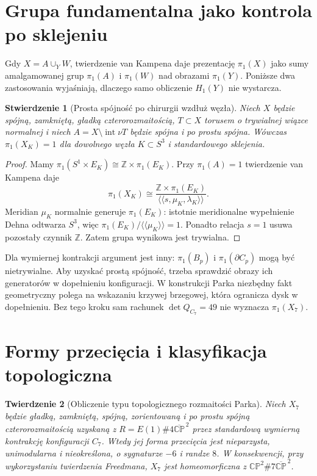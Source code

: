 \documentclass[11pt,a4paper]{report}
\numberwithin{equation}{section}
\theoremstyle{plain}
\newtheorem{twierdzenie}{Twierdzenie}[section]
\newtheorem{stwierdzenie}[twierdzenie]{Stwierdzenie}
\theoremstyle{definition}
\theoremstyle{remark}
\begin{document}
\section{Grupa fundamentalna jako kontrola po sklejeniu}
\label{sec:tg-syn-pi1}

Gdy $X=A\cup_Y W$, twierdzenie van Kampena daje prezentację
$\pi_1(X)$ jako sumy amalgamowanej grup $\pi_1(A)$ i
$\pi_1(W)$ nad obrazami $\pi_1(Y)$. Poniższe dwa zastosowania
wyjaśniają, dlaczego samo obliczenie $H_1(Y)$ nie wystarcza.

\begin{stwierdzenie}[Prosta spójność po chirurgii wzdłuż węzła]
\label{prop:tg-syn-pi1}
Niech $X$ będzie spójną, zamkniętą, gładką czterorozmaitością,
$T\subset X$ torusem o trywialnej wiązce normalnej i niech
$A=X\setminus\operatorname{int}\nu T$ będzie spójna i po prostu
spójna. Wówczas $\pi_1(X_K)=1$ dla dowolnego węzła
$K\subset S^3$ i standardowego sklejenia.
\end{stwierdzenie}

\begin{proof}
Mamy $\pi_1(S^1\times E_K)\cong\mathbb Z\times\pi_1(E_K)$.
Przy $\pi_1(A)=1$ twierdzenie van Kampena daje
\[
 \pi_1(X_K)\cong
 \frac{\mathbb Z\times\pi_1(E_K)}
 {\langle\!\langle s,\mu_K,\lambda_K\rangle\!\rangle}.
\]
Meridian $\mu_K$ normalnie generuje $\pi_1(E_K)$: istotnie
meridionalne wypełnienie Dehna odtwarza $S^3$, więc
$\pi_1(E_K)/\langle\!\langle\mu_K\rangle\!\rangle=1$.
Ponadto relacja $s=1$ usuwa pozostały czynnik $\mathbb Z$.
Zatem grupa wynikowa jest trywialna.
\end{proof}

Dla wymiernej kontrakcji argument jest inny:
$\pi_1(B_p)$ i $\pi_1(\partial C_p)$ mogą być nietrywialne.
Aby uzyskać prostą spójność, trzeba sprawdzić obrazy ich
generatorów w dopełnieniu konfiguracji. W konstrukcji Parka
niezbędny fakt geometryczny polega na wskazaniu krzywej
brzegowej, która ogranicza dysk w dopełnieniu. Bez tego
kroku sam rachunek $\det Q_{C_7}=49$ nie wyznacza
$\pi_1(X_7)$.

\section{Formy przecięcia i klasyfikacja topologiczna}
\label{sec:tg-syn-freedman}

\begin{twierdzenie}[Obliczenie typu topologicznego rozmaitości Parka]
\label{thm:tg-syn-park-homeo}
Niech $X_7$ będzie gładką, zamkniętą, spójną,
zorientowaną i po prostu spójną czterorozmaitością
uzyskaną z $R=E(1)\#4\overline{\mathbb{CP}}^{\,2}$
przez standardową wymierną kontrakcję konfiguracji $C_7$.
Wtedy jej forma przecięcia jest nieparzysta, unimodularna
i nieokreślona, o sygnaturze $-6$ i randze $8$.
W konsekwencji, przy wykorzystaniu twierdzenia Freedmana,
$X_7$ jest homeomorficzna z
$\mathbb{CP}^2\#7\overline{\mathbb{CP}}^{\,2}$.
\end{twierdzenie}
\end{document}
